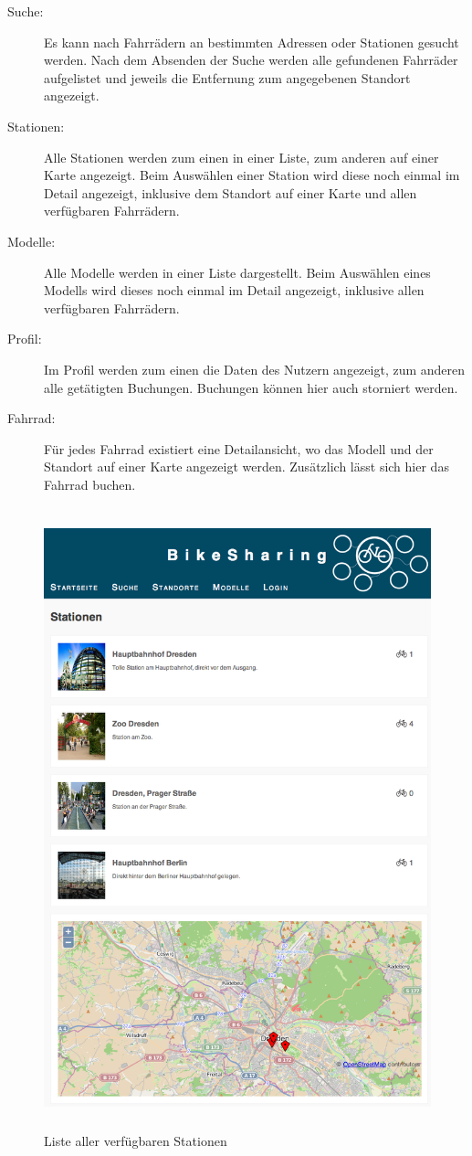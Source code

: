 \begin{description}
	\item[Suche:] Es kann nach Fahrrädern an bestimmten Adressen oder Stationen gesucht werden. Nach dem Absenden der Suche werden alle gefundenen Fahrräder aufgelistet und jeweils die Entfernung zum angegebenen Standort angezeigt.
	\item[Stationen:] Alle Stationen werden zum einen in einer Liste, zum anderen auf einer Karte angezeigt. Beim Auswählen einer Station wird diese noch einmal im Detail angezeigt, inklusive dem Standort auf einer Karte und allen verfügbaren Fahrrädern.
	\item[Modelle:] Alle Modelle werden in einer Liste dargestellt. Beim Auswählen eines Modells wird dieses noch einmal im Detail angezeigt, inklusive allen verfügbaren Fahrrädern.
	\item[Profil:] Im Profil werden zum einen die Daten des Nutzern angezeigt, zum anderen alle getätigten Buchungen. Buchungen können hier auch storniert werden.
	\item[Fahrrad:] Für jedes Fahrrad existiert eine Detailansicht, wo das Modell und der Standort auf einer Karte angezeigt werden. Zusätzlich lässt sich hier das Fahrrad buchen.
\end{description}



\begin{figure}[h]
        \centering
	\includegraphics[height=180mm]{pics/bikesharing_stations.png}
	\caption{Liste aller verfügbaren Stationen}
\end{figure}

